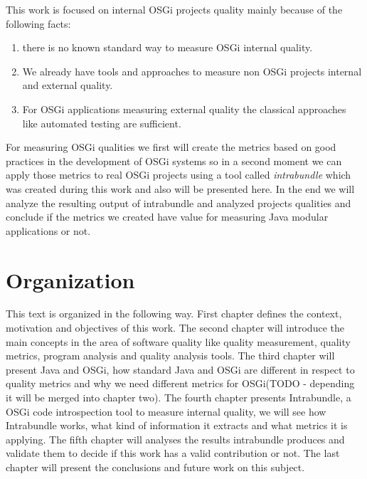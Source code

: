 This work is focused on internal OSGi projects quality mainly because of the following facts:
\begin{enumerate}
  \item there is no known standard way to measure OSGi internal quality.
  \item We already have tools and approaches to measure non OSGi projects internal and external quality.
  \item For OSGi applications measuring external quality the classical approaches like automated testing are sufficient.
\end{enumerate}
For measuring OSGi qualities we first will create the metrics based on good practices in the development of OSGi systems so in a second moment we can apply those metrics to real OSGi projects using a tool called \emph{intrabundle} which was created during this work and also will be presented here. In the end we will analyze the resulting output of intrabundle and analyzed projects qualities and conclude if the metrics we created have value for measuring Java modular applications or not.  

 
\section{Organization}

This text is organized in the following way. First chapter defines the context, motivation and objectives of this work. The second chapter will introduce the main concepts in the area of software quality like quality measurement, quality metrics, program analysis and quality analysis tools. The third chapter will present Java and OSGi, how standard Java and OSGi are different in respect to quality metrics and why we need different metrics for OSGi(TODO - depending it will be merged into chapter two). The fourth chapter presents Intrabundle, a OSGi code introspection tool to measure internal quality, we will see how Intrabundle works, what kind of information it extracts and what metrics it is applying. The fifth chapter will analyses the results intrabundle produces and validate them to decide if this work has a valid contribution or not. The last chapter will present the conclusions and future work on this subject. 
   
 